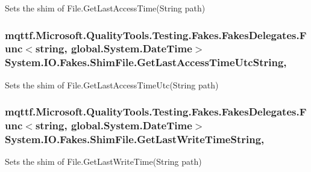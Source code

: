 Sets the shim of File.\-Get\-Last\-Access\-Time(\-String path)

\hypertarget{class_system_1_1_i_o_1_1_fakes_1_1_shim_file_a9a300401cff73adf2bae5fd17174186f}{
\subsubsection[{Get\-Last\-Access\-Time\-Utc\-String}]{\setlength{\rightskip}{0pt plus 5cm}mqttf.\-Microsoft.\-Quality\-Tools.\-Testing.\-Fakes.\-Fakes\-Delegates.\-Func$<$string, global.\-System.\-Date\-Time$>$ System.\-I\-O.\-Fakes.\-Shim\-File.\-Get\-Last\-Access\-Time\-Utc\-String\hspace{0.3cm}{\ttfamily [static]}, {\ttfamily [set]}}}\label{class_system_1_1_i_o_1_1_fakes_1_1_shim_file_a9a300401cff73adf2bae5fd17174186f}


Sets the shim of File.\-Get\-Last\-Access\-Time\-Utc(\-String path)

\hypertarget{class_system_1_1_i_o_1_1_fakes_1_1_shim_file_a7df3ab6275712b1ae977a1ade28de4db}{
\subsubsection[{Get\-Last\-Write\-Time\-String}]{\setlength{\rightskip}{0pt plus 5cm}mqttf.\-Microsoft.\-Quality\-Tools.\-Testing.\-Fakes.\-Fakes\-Delegates.\-Func$<$string, global.\-System.\-Date\-Time$>$ System.\-I\-O.\-Fakes.\-Shim\-File.\-Get\-Last\-Write\-Time\-String\hspace{0.3cm}{\ttfamily [static]}, {\ttfamily [set]}}}\label{class_system_1_1_i_o_1_1_fakes_1_1_shim_file_a7df3ab6275712b1ae977a1ade28de4db}


Sets the shim of File.\-Get\-Last\-Write\-Time(\-String path)

